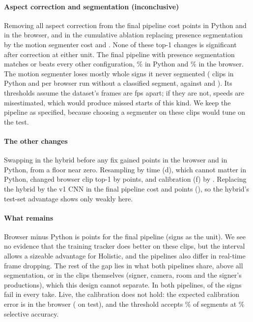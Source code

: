 \paragraph*{Aspect correction and segmentation (inconclusive)}
Removing all aspect correction from the final pipeline cost  points in
Python and  in the browser, and in the cumulative ablation replacing
presence segmentation by the motion segmenter cost  and
. None of these top-1 changes is significant after correction at
either unit. The final pipeline with presence segmentation matches or beats every other
configuration, \% in Python and \% in the browser.
The motion segmenter loses mostly whole signs it never segmented ( clips in
Python and  per browser run without a classified segment, against
 and ). Its thresholds assume the dataset's
frames are  fps apart; if they are not, speeds are misestimated, which would
produce missed starts of this kind. We keep the pipeline as specified, because choosing a
segmenter on these clips would tune on the test.

\ifwithdetails
\paragraph*{The other changes}
Swapping in the hybrid before any fix gained  points in the browser and
 in Python, from a floor near zero. Resampling by time (d), which cannot
matter in Python, changed browser clip top-1 by  points, and calibration
(f) by . Replacing the hybrid by the v1 CNN in the final pipeline cost
 and  points (), so
the hybrid's test-set advantage shows only weakly here.
\fi

\paragraph*{What remains}
Browser minus Python is  points  for the final pipeline
(signs as the unit). We see no evidence that the training tracker does better on these clips, but
the interval allows a sizeable advantage for Holistic, and the pipelines also differ in real-time
frame dropping. The rest of the gap lies in what both pipelines share, above all segmentation, or
in the clips themselves (signer, camera, room and the signer's productions), which this design
cannot separate. In both pipelines,  of the  signs fail in every take.
Live, the calibration does not hold: the expected calibration error is  in the
browser ( on test), and the threshold accepts \% of segments at
\% selective accuracy.

